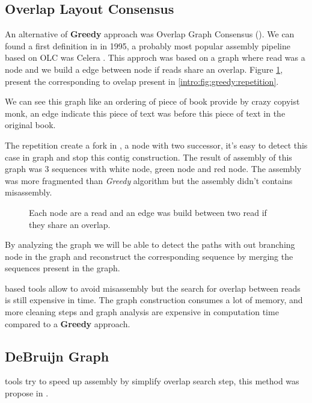 \documentclass[./main.tex]{subfiles}
\begin{document}
\subsection{Overlap Layout Consensus}

An alternative of \textbf{Greedy} approach was Overlap Graph Consensus (\OLC). We can found a first \OLC definition in \cite{OLC_myers} in 1995, a probably most popular assembly pipeline based on OLC was Celera \cite{celera_first, celera_second}. This approch was based on a graph where read was a node and we build a edge between node if reads share an overlap. Figure \ref{intro:fig:olc:graph}, present the \OLC corresponding to ovelap present in \ref{intro:fig:greedy:repetition}.

We can see this graph like an ordering of piece of book provide by crazy copyist monk, an edge indicate this piece of text was before this piece of text in the original book.

The repetition create a fork in \OLC, a node with two successor, it's easy to detect this case in graph and stop this contig construction. The result of assembly of this graph was 3 sequences with white node, green node and red node. The assembly was more fragmented than \textit{Greedy} algorithm but the assembly didn't contains misassembly.

\begin{figure}[ht]
    \centering 
    
    \caption{Each node are a read and an edge was build between two read if they share an overlap.}
    \label{intro:fig:olc:graph}
\end{figure}

By analyzing the graph we will be able to detect the paths with out branching node in the graph and reconstruct the corresponding sequence by merging the sequences present in the graph.

\OLC based tools allow to avoid misassembly but the search for overlap between reads is still expensive in time. The graph construction consumes a lot of memory, and more cleaning steps and graph analysis are expensive in computation time compared to a \textbf{Greedy} approach. 

\subsection{DeBruijn Graph}

\DBG tools try to speed up assembly by simplify overlap search step, this method was propose in  \cite{eulerian_approach}.
\end{document}
